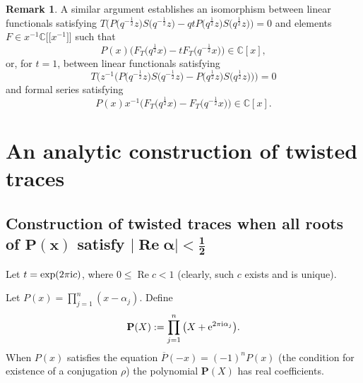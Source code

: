 \documentclass[10pt,a4paper]{amsart}
\newcommand{\CN}{\mathbb{C}} %
\newcommand{\ovl}{\overline}
\renewcommand{\Re}{\operatorname{Re}}
\newcommand{\bP}{\mathbf{P}}
\theoremstyle{definition}
\newtheorem{Remark}[Theorem]{Remark}
\numberwithin{equation}{section}
\begin{document}
\begin{Remark}
 A similar argument establishes an isomorphism between linear functionals
 satisfying $T\big(P\big(q^{-\frac{1}{2}}z\big)S\big(q^{-\frac{1}{2}}z\big)-qt P\big(q^{\frac{1}{2}}z\big)S\big(q^{\frac{1}{2}}z\big)\big)=0$ and
 elements $F\in x^{-1}\CN\big[\big[x^{-1}\big]\big]$ such that
 \[
 P(x)\big(F_T\big(q^{\frac{1}{2}}x\big)-t F_T\big(q^{-\frac{1}{2}}x\big)\big) \in \CN[x],
 \]
 or, for $t=1$, between linear functionals satisfying
 \[
 T\big(z^{-1}\big(P\big(q^{-\frac{1}{2}}z\big)S\big(q^{-\frac{1}{2}}z\big)
 -P\big(q^{\frac{1}{2}}z\big)S\big(q^{\frac{1}{2}}z\big)\big)\big)=0
 \]
 and formal series satisfying
 \[
 P(x) x^{-1}\big(F_T\big(q^{\frac{1}{2}}x\big)-F_T\big(q^{-\frac{1}{2}}x\big)\big)\in \CN[x].
 \]
\end{Remark}

\section{An analytic construction of twisted traces}\label{sec3}

\subsection[Construction of twisted traces when all roots of P(x) satisfy |Re alpha|<1/2]
{Construction of twisted traces when all roots of $\boldsymbol{P(x)}$ satisfy $\boldsymbol{|\Re\alpha|<\frac{1}{2}}$}
Let $t=\exp(2\pi {\rm i} c)$, where $0\le \Re c<1$ (clearly, such $c$ exists and is unique).

Let $P(x)=\prod_{j=1}^n(x-\alpha_j)$. Define
\[
\bP(X):=\prod_{j=1}^n\big(X+{\rm e}^{2\pi {\rm i}\alpha_j}\big).
\]
 When $P(x)$ satisfies the equation $\ovl{P}(-x)=(-1)^nP(x)$
 (the condition for existence of a conjugation $\rho$) the polynomial $\bP(X)$ has real coefficients.
\end{document}
